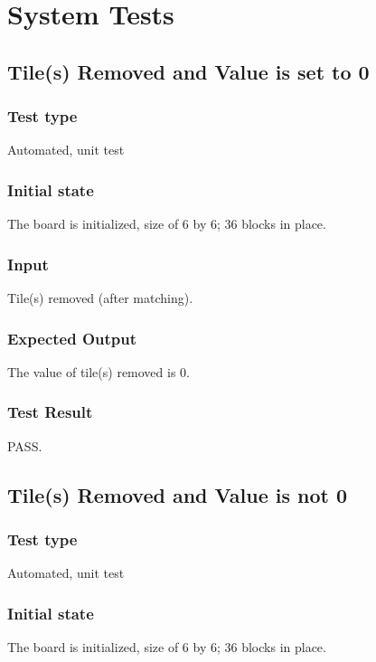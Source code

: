 \documentclass[12pt]{article}
\begin{document}
\newpage


\section{System Tests}
\subsection{Tile(s) Removed and Value is set to 0}

\subsubsection{Test type}
Automated, unit test

\subsubsection{Initial state}
The board is initialized, size of 6 by 6; 36 blocks in place.

\subsubsection{Input}
Tile(s) removed (after matching).

\subsubsection{Expected Output}
The value of tile(s) removed is 0.

\subsubsection{Test Result}
PASS.

\newpage

\subsection{Tile(s) Removed and Value is not 0}
\subsubsection{Test type}
Automated, unit test

\subsubsection{Initial state}
The board is initialized, size of 6 by 6; 36 blocks in place.
\end{document}
